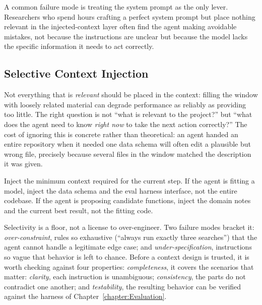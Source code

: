 \begin{remark}
A common failure mode is treating the system prompt as the only lever.
Researchers who spend hours crafting a perfect system prompt but place nothing relevant in the injected-context layer often find the agent making avoidable mistakes, not because the instructions are unclear but because the model lacks the specific information it needs to act correctly.
\end{remark}

\subsection{Selective Context Injection}

Not everything that is \emph{relevant} should be placed in the context: filling the window with loosely related material can degrade performance as reliably as providing too little.
The right question is not ``what is relevant to the project?'' but ``what does the agent need to know \emph{right now} to take the next action correctly?''
The cost of ignoring this is concrete rather than theoretical: an agent handed an entire repository when it needed one data schema will often edit a plausible but wrong file, precisely because several files in the window matched the description it was given.

\begin{principle}
\label{principle:SelectiveContext}
Inject the minimum context required for the current step.
If the agent is fitting a model, inject the data schema and the eval harness interface, not the entire codebase.
If the agent is proposing candidate functions, inject the domain notes and the current best result, not the fitting code.
\end{principle}

\begin{remark}
Selectivity is a floor, not a license to over-engineer.
Two failure modes bracket it: \emph{over-constraint}, rules so exhaustive (``always run exactly three searches'') that the agent cannot handle a legitimate edge case; and \emph{under-specification}, instructions so vague that behavior is left to chance.
Before a context design is trusted, it is worth checking against four properties: \emph{completeness}, it covers the scenarios that matter: \emph{clarity}, each instruction is unambiguous; \emph{consistency}, the parts do not contradict one another; and \emph{testability}, the resulting behavior can be verified against the harness of Chapter~\ref{chapter:Evaluation}.
\end{remark}

